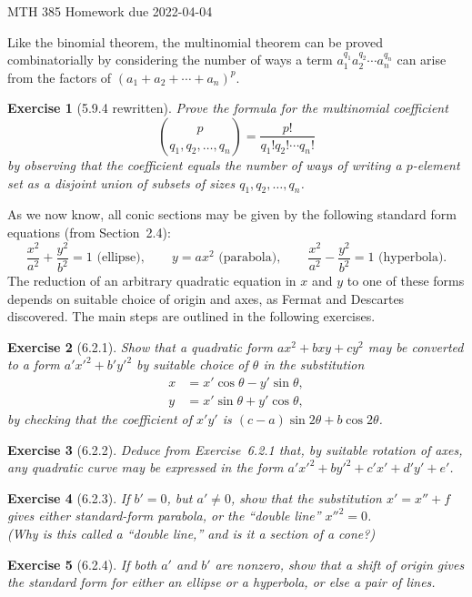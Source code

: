 \documentclass[12pt]{article}
\theoremstyle{plain}
\newtheorem{ex}{Exercise}
\begin{document}
MTH 385 \qquad Homework due 2022-04-04

Like the binomial theorem, the multinomial theorem can be proved combinatorially by considering the number of ways a term $a_1^{q_1}a_2^{q_2}\cdots a_n^{q_n}$ can arise from the factors of $(a_1+a_2+\cdots+a_n)^p$.

\begin{ex} [5.9.4 rewritten]
  Prove the formula for the multinomial coefficient
  \[
    \binom{p}{q_1,q_2,\ldots,q_n}=\frac{p!}{q_1!q_2!\cdots q_n!}
  \]
  by observing that the coefficient equals the number of ways of writing a $p$-element set as a disjoint union of subsets of sizes $q_1,q_2,\ldots,q_n$.
\end{ex}

As we now know, all conic sections may be given by the following standard form equations (from Section~2.4):
\[
  \frac{x^2}{a^2}+\frac{y^2}{b^2}=1\text{ (ellipse)},\qquad y=ax^2\text{ (parabola)},\qquad  \frac{x^2}{a^2}-\frac{y^2}{b^2}=1\text{ (hyperbola)}.
\]
The reduction of an arbitrary quadratic equation in $x$ and $y$ to one of these forms depends on suitable choice of origin and axes, as Fermat and Descartes discovered. The main steps are outlined in the following exercises.

\begin{ex} [6.2.1]
  Show that a \emph{quadratic form} $ax^2+bxy+cy^2$ may be converted to a form $a'x'^2+b'y'^2$ by suitable choice of $\theta$ in the substitution
  \begin{align*}
    x &= x'\cos\theta-y'\sin\theta, \\
    y &= x'\sin\theta+y'\cos\theta,
  \end{align*}
  by checking that the coefficient of $x'y'$ is $(c-a)\sin2\theta+b\cos2\theta$.
\end{ex}

\begin{ex} [6.2.2]
  Deduce from Exercise~6.2.1 that, by suitable rotation of axes, any quadratic curve may be expressed in the form $a'x'^2+by'^2+c'x'+d'y'+e'$.
\end{ex}

\begin{ex} [6.2.3]
  If $b'=0$, but $a'\neq0$, show that the substitution $x'=x''+f$ gives either  standard-form parabola, or the ``double line'' $x''^2=0$. \\
  (Why is this called a ``double line,'' and is it a section of a cone?)
\end{ex}

\begin{ex} [6.2.4]
  If both $a'$ and $b'$ are nonzero, show that a shift of origin gives the standard form for either an ellipse or a hyperbola, or else a pair of lines.
\end{ex}
\end{document}
